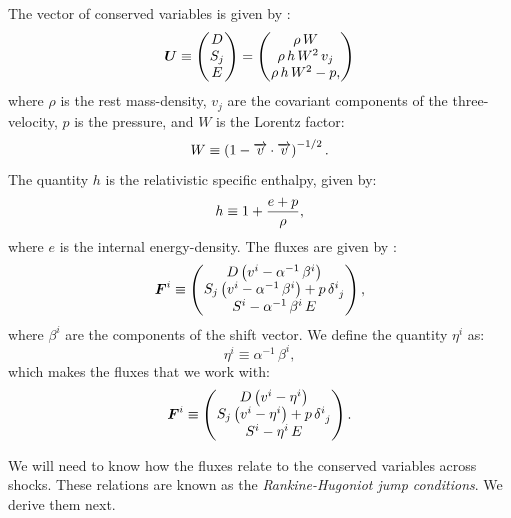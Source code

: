 \documentclass[10pt,preprint]{../aastex}
\begin{document}
The vector of conserved variables is given by \citep{Mignone2005}:
\begin{equation}
    \boldsymbol{U}\equiv
    \begin{pmatrix}
      D \\
      S_{j} \\
      E
    \end{pmatrix}=
    \begin{pmatrix}
      \rho\,W \\
      \rho\,h\,W^{2}\,v_{j} \\
      \rho\,h\,W^{2}-p,
    \end{pmatrix}
\end{equation}
where $\rho$ is the rest mass-density, $v_{j}$ are the covariant components of the three-velocity, $p$ is the pressure, and $W$ is the Lorentz factor:
\begin{equation}
    W\equiv\left(1-\overrightarrow{v}\cdot\overrightarrow{v}\right)^{-1/2}.
\end{equation}
The quantity $h$ is the relativistic specific enthalpy, given by:
\begin{equation}
    h\equiv1+\frac{e+p}{\rho},
\end{equation}
where $e$ is the internal energy-density. The fluxes are given by \citep{RezzollaRelHyd}:
\begin{equation}
    \boldsymbol{F}^{i}\equiv
    \begin{pmatrix}
      D\left(v^{i}-\alpha^{-1}\,\beta^{i}\right) \\
      S_{j}\left(v^{i}-\alpha^{-1}\,\beta^{i}\right) + p\,\delta^{i}_{~j} \\
      S^{i}-\alpha^{-1}\,\beta^{i}\,E
    \end{pmatrix},
\end{equation}
where $\beta^{i}$ are the components of the shift vector. We define the quantity $\eta^{i}$ as:
\begin{equation}
    \eta^{i}\equiv\alpha^{-1}\,\beta^{i},
\end{equation}
which makes the fluxes that we work with:
\begin{equation}
    \boldsymbol{F}^{i}\equiv
    \begin{pmatrix}
      D\left(v^{i}-\eta^{i}\right) \\
      S_{j}\left(v^{i}-\eta^{i}\right) + p\,\delta^{i}_{~j} \\
      S^{i}-\eta^{i}\,E
    \end{pmatrix}.
\end{equation}

We will need to know how the fluxes relate to the conserved variables across shocks. These relations are known as the \textit{Rankine-Hugoniot jump conditions}. We derive them next.
\end{document}
